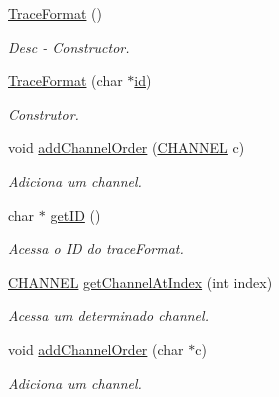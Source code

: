 \begin{DoxyCompactItemize}
\item 
\hyperlink{classbr_1_1ufscar_1_1lince_1_1mmi_1_1ink_1_1TraceFormat_a94ab4a2d743d17fb14c2af98a62b0550}{TraceFormat} ()
\begin{DoxyCompactList}\small\item\em Desc -\/ Constructor. \item\end{DoxyCompactList}\item 
\hyperlink{classbr_1_1ufscar_1_1lince_1_1mmi_1_1ink_1_1TraceFormat_ae3d05ea0cfd71e7af419ddc36b05cdc8}{TraceFormat} (char $\ast$\hyperlink{classbr_1_1ufscar_1_1lince_1_1mmi_1_1ink_1_1TraceFormat_ad89fcbbb40fb5691df020fa57b325f44}{id})
\begin{DoxyCompactList}\small\item\em Construtor. \item\end{DoxyCompactList}\item 
void \hyperlink{classbr_1_1ufscar_1_1lince_1_1mmi_1_1ink_1_1TraceFormat_a4f21a24e009159e4062f2a2a47cc68fc}{addChannelOrder} (\hyperlink{namespacebr_1_1ufscar_1_1lince_1_1mmi_1_1ink_a857f7b80c5d28f256c70d78cacf91dab}{CHANNEL} c)
\begin{DoxyCompactList}\small\item\em Adiciona um channel. \item\end{DoxyCompactList}\item 
char $\ast$ \hyperlink{classbr_1_1ufscar_1_1lince_1_1mmi_1_1ink_1_1TraceFormat_afc72b9eb02901fb2a58c159b73231c6a}{getID} ()
\begin{DoxyCompactList}\small\item\em Acessa o ID do traceFormat. \item\end{DoxyCompactList}\item 
\hyperlink{namespacebr_1_1ufscar_1_1lince_1_1mmi_1_1ink_a857f7b80c5d28f256c70d78cacf91dab}{CHANNEL} \hyperlink{classbr_1_1ufscar_1_1lince_1_1mmi_1_1ink_1_1TraceFormat_af6c038f7182928e11aedafe61a7f1af0}{getChannelAtIndex} (int index)
\begin{DoxyCompactList}\small\item\em Acessa um determinado channel. \item\end{DoxyCompactList}\item 
void \hyperlink{classbr_1_1ufscar_1_1lince_1_1mmi_1_1ink_1_1TraceFormat_a5427bd1c07566f405591f38dfd2ec5f9}{addChannelOrder} (char $\ast$c)
\begin{DoxyCompactList}\small\item\em Adiciona um channel. \item\end{DoxyCompactList}\end{DoxyCompactItemize}
